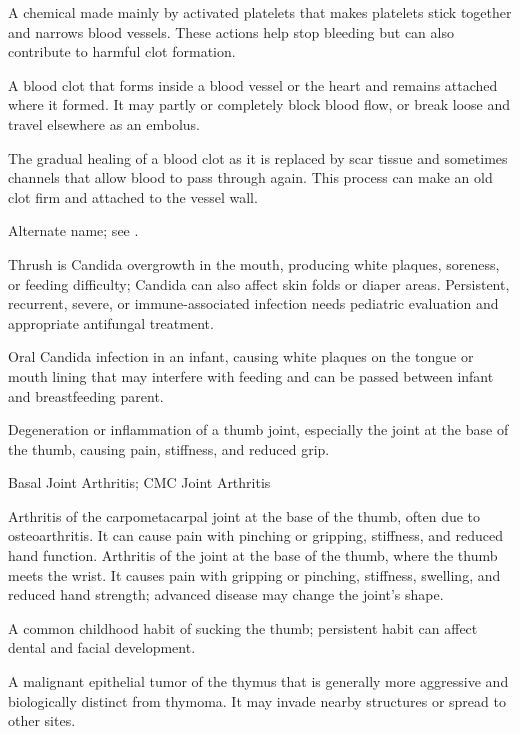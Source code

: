  A chemical made mainly by activated platelets that makes platelets stick together and narrows blood vessels. These actions help stop bleeding but can also contribute to harmful clot formation.

 A blood clot that forms inside a blood vessel or the heart and remains attached where it formed. It may partly or completely block blood flow, or break loose and travel elsewhere as an embolus.

 The gradual healing of a blood clot as it is replaced by scar tissue and sometimes channels that allow blood to pass through again. This process can make an old clot firm and attached to the vessel wall.

 Alternate name; see .

 Thrush is Candida overgrowth in the mouth, producing white plaques, soreness, or feeding difficulty; Candida can also affect skin folds or diaper areas. Persistent, recurrent, severe, or immune-associated infection needs pediatric evaluation and appropriate antifungal treatment.

 Oral Candida infection in an infant, causing white plaques on the tongue or mouth lining that may interfere with feeding and can be passed between infant and breastfeeding parent.

 Degeneration or inflammation of a thumb joint, especially the joint at the base of the thumb, causing pain, stiffness, and reduced grip.

\synonyms
Basal Joint Arthritis; CMC Joint Arthritis

 Arthritis of the carpometacarpal joint at the base of the thumb, often due to osteoarthritis. It can cause pain with pinching or gripping, stiffness, and reduced hand function.
 Arthritis of the joint at the base of the thumb, where the thumb meets the wrist. It causes pain with gripping or pinching, stiffness, swelling, and reduced hand strength; advanced disease may change the joint’s shape.

 A common childhood habit of sucking the thumb; persistent habit can affect dental and facial development.

 A malignant epithelial tumor of the thymus that is generally more aggressive and biologically distinct from thymoma. It may invade nearby structures or spread to other sites.

